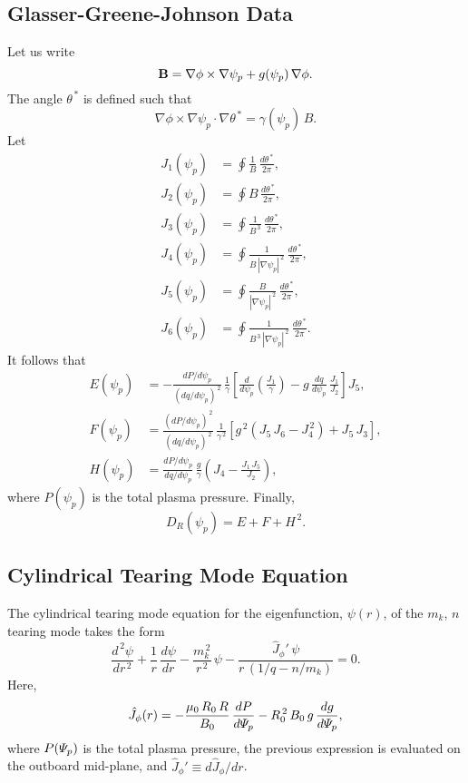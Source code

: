 \documentclass[notitlepage,12pt]{article}
\begin{document}
\subsection{Glasser-Greene-Johnson Data}
Let us write
\begin{equation}
{\bf B} = \nabla\phi\times\nabla\psi_p+g(\psi_p)\,\nabla\phi.
\end{equation}
The angle $\theta^{\,\ast}$ is defined such that
\begin{equation}
\nabla\phi\times\nabla\psi_p\cdot\nabla\theta^{\,\ast} = \gamma(\psi_p)\,B.
\end{equation}
Let
\begin{align}
J_1(\psi_p) &= \oint\frac{1}{B}\,\frac{d\theta^{\,\ast}}{2\pi},\\[0.5ex]
J_2(\psi_p) &= \oint B\,\frac{d\theta^{\,\ast}}{2\pi},\\[0.5ex]
J_3(\psi_p) &= \oint\frac{1}{B^{\,3}}\,\frac{d\theta^{\,\ast}}{2\pi},\\[0.5ex]
J_4(\psi_p) &= \oint\frac{1}{B\,|\nabla\psi_p|^{\,2}}\,\frac{d\theta^{\,\ast}}{2\pi},\\[0.5ex]
J_5(\psi_p) &= \oint\frac{B}{|\nabla\psi_p|^{\,2}}\,\frac{d\theta^{\,\ast}}{2\pi},\\[0.5ex]
J_6(\psi_p) &= \oint\frac{1}{B^{\,3}\,|\nabla\psi_p|^{\,2}}\,\frac{d\theta^{\,\ast}}{2\pi}.
\end{align}
It follows that
\begin{align}
E(\psi_p) &= - \frac{dP/d\psi_p}{(dq/d\psi_p)^{\,2}}\,\frac{1}{\gamma}\left[\frac{d}{d\psi_p}\!\left(\frac{J_1}{\gamma}\right) - g\,\frac{dq}{d\psi_p}\,\frac{J_1}{J_2}\right]J_5,\\[0.5ex]
F(\psi_p) &= \frac{(dP/d\psi_p)^{\,2}}{(dq/d\psi_p)^{\,2}}\,\frac{1}{\gamma^{\,2}}\left[g^{\,2}\left(J_5\,J_6- J_4^{\,2}\right)+ J_5\,J_3\right],
\\[0.5ex]
H(\psi_p)&= \frac{dP/d\psi_p}{dq/d\psi_p}\,\frac{g}{\gamma}\left(J_4 - \frac{J_1\,J_5}{J_2}\right),
\end{align}
where $P(\psi_p)$ is the total plasma pressure. 
Finally,
\begin{equation}
D_R(\psi_p)= E + F + H^{\,2}.
\end{equation}


\subsection{Cylindrical Tearing Mode Equation}
The cylindrical tearing mode equation for the eigenfunction, $\psi(r)$,  of the $m_k$, $n$ tearing mode takes the form
\begin{equation}
\frac{d^{\,2}\psi}{dr^{\,2}}+ \frac{1}{r}\,\frac{d\psi}{dr}-\frac{m_k^{\,2}}{r^{\,2}}\,\psi - \frac{\hat{J}_\phi'\,\psi}{r\,(1/q-n/m_k)}=0.
\end{equation}
Here, 
\begin{equation}
\hat{J}_\phi(r) = - \frac{\mu_0\,R_0\,R}{B_0}\,\frac{dP}{d{\mit\Psi}_p} - R_0^{\,2}\,B_0\,g\,\frac{dg}{d{\mit\Psi}_p},
\end{equation}
where $P({\mit\Psi}_p)$ is the total plasma pressure,  the previous expression is evaluated on the outboard mid-plane, and
$\hat{J}_\phi'\equiv d\hat{J}_\phi/dr$. 
\end{document}
